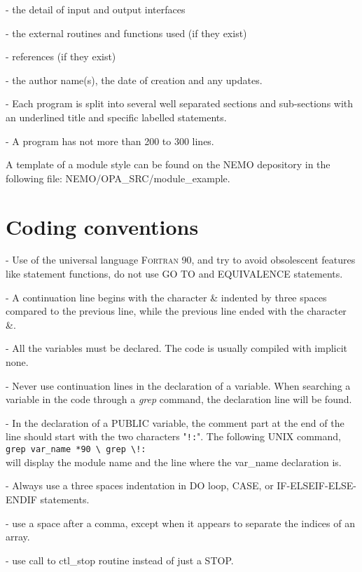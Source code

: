 \documentclass[../main/NEMO_manual]{subfiles}
\begin{document}
- the detail of input and output interfaces

- the external routines and functions used (if they exist)

- references (if they exist)

- the author name(s), the date of creation and any updates.

- Each program is split into several well separated sections and
sub-sections with an underlined title and specific labelled statements.

- A program has not more than 200 to 300 lines.

A template of a module style can be found on the NEMO depository in the following file:
NEMO/OPA\_SRC/module\_example.
\section{Coding conventions}
\label{sec:D_coding}

- Use of the universal language \textsc{Fortran} 90, and try to avoid obsolescent features like statement functions,
do not use GO TO and EQUIVALENCE statements.

- A continuation line begins with the character {\&} indented by three spaces compared to the previous line,
while the previous line ended with the character {\&}.

- All the variables must be declared.
The code is usually compiled with implicit none.
 
- Never use continuation lines in the declaration of a variable.
When searching a variable in the code through a \textit{grep} command, the declaration line will be found.

- In the declaration of a PUBLIC variable, the comment part at the end of the line should start with
the two characters "\verb?!:?".
The following UNIX command, \\
\verb?grep var_name *90 \ grep \!: ? \\
will display the module name and the line where the var\_name declaration is.

- Always use a three spaces indentation in DO loop, CASE, or IF-ELSEIF-ELSE-ENDIF statements.

- use a space after a comma, except when it appears to separate the indices of an array.

- use call to ctl\_stop routine instead of just a STOP.
\end{document}
